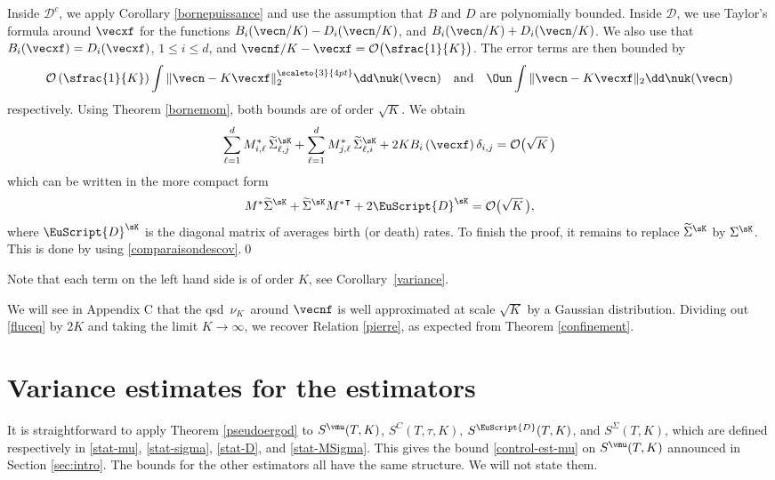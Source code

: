 Inside $\mathcal{D}^c$, we apply Corollary \ref{bornepuissance} and use the assumption that $B$ and $D$ are polynomially
bounded. Inside $\mathcal{D}$, we use Taylor's formula around $\vecxf$ for the functions $B_i(\vecn/K)-D_i(\vecn/K)$, and
$B_i(\vecn/K)+D_i(\vecn/K)$. We also use that $B_{i}(\vecxf)=D_{i}(\vecxf)$, $1\le i\le d$, and $\vecnf/K-\vecxf=
\mathcal{O}\bigl(\sfrac{1}{K}\bigr)$. The error terms are then bounded by
\[
\mathcal{O}\left(\sfrac{1}{K}\right)\int \|\vecn-K\vecxf\|_{2}^{\scaleto{3}{4pt}} \dd \nuk(\vecn)\quad\text{and}\quad
\Oun \int \|\vecn-K\vecxf\|_{2} \dd \nuk(\vecn)
\]
respectively. Using Theorem \ref{bornemom}, both bounds are of order $\sqrt{K}$.
We obtain
\[
\sum_{\ell=1}^{d}M_{i,\ell}^{*}\,\widetilde{\Sigma}^{\sK}_{\ell,j}+
\sum_{\ell=1}^{d}M_{j,\ell}^*\,\widetilde{\Sigma}^{\sK}_{\ell,i}+2K B_{i}\left(\vecxf\right)\delta_{i,j}
=\mathcal{O}\bigl(\sqrt K\,\bigr)
\]
which can be written in the more compact form
\begin{equation}\label{fluceq}
M^* \widetilde{\Sigma}^{\sK}+\widetilde{\Sigma}^{\sK} {M^*}^{\intercal}+2\EuScript{D}^{\sK}=\mathcal{O}\bigl(\sqrt K\,\bigr),
\end{equation}
where $\EuScript{D}^{\sK}$ is the diagonal matrix of averages birth (or death) rates. To finish the proof, it remains to
replace $\widetilde\Sigma^{\sK}$ by $\Sigma^{\sK}$. This is done by using \eqref{comparaisondescov}.\qed

\begin{remark}
Note that each term on the left hand side is of order $K$, see Corollary~\ref{variance}.
\end{remark}
\begin{remark} We will see in Appendix C that the qsd $\,\nu_{K}\,$ around $\vecnf$ is well approximated at scale $\sqrt{K}$ by a Gaussian distribution.
Dividing out \eqref{fluceq} by $2K$ and taking the limit $K\to\infty$, we recover Relation \eqref{pierre}, as expected from Theorem \ref{confinement}.
\end{remark}

\section{Variance estimates for the estimators}
\label{sec:stat}

It is straightforward to apply Theorem \ref{pseudoergod} to $S^{\vmu}(T,K)$,
$S^{C}(T,\tau,K)$, $S^{{ \EuScript{D}}}(T,K)$, and
$S^{{ \Sigma}}(T,K)$, which are defined respectively in \eqref{stat-mu}, \eqref{stat-sigma}, \eqref{stat-D},
and \eqref{stat-MSigma}. This gives the bound \eqref{control-est-mu} on $S^{\vmu}(T,K)$ announced in
Section \ref{sec:intro}. The bounds for the other estimators all have the same structure. We will not state them.

